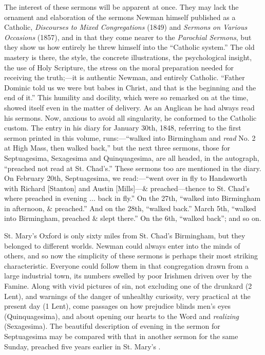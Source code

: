 The interest of these sermons will be apparent at
once. They may lack the ornament and elaboration of the sermons Newman
himself published as a Catholic, \emph{Discourses to Mixed Congregations}
(1849) and \emph{Sermons} \emph{on Various Occasions} (1857), and
in that they come nearer to the \emph{Parochial Sermons}, but they
show us how entirely he threw himself into the ``Catholic system.'' The
old mastery is there, the style, the concrete illustrations, the
psychological insight, the use of Holy Scripture, the stress on the
moral preparation needed for receiving the truth;—it is authentic
Newman, and entirely Catholic. ``Father Dominic told us we were but
babes in Christ, and that is the beginning and the end of it.'' This
humility and docility, which were so remarked on at the time, showed
itself even in the matter of delivery. As an Anglican he had always
read his sermons. Now, anxious to avoid all singularity, he conformed
to the Catholic custom. The entry in his diary for January 30th, 1848,
referring to the first sermon printed in this volume, runs:—``walked
into Birmingham and \emph{read} No. 2 at High Mass, then walked back,''
but the next three sermons, those for Septuagesima, Sexagesima and
Quinquagesima, are all headed, in the autograph, ``preached not read at
St. Chad's.'' These sermons too are mentioned in the diary. On February
20th, Septuagesima, we read:—``went over in fly to Handsworth with
Richard [Stanton] and Austin [Mills]—\& preached—thence to St.
Chad's where preached in evening ... back in fly.'' On the 27th, ``walked
into Birmingham in afternoon, \& preached.'' And on the 28th, ``walked
back.'' March 5th, ``walked into Birmingham, preached \& slept
there.'' On the 6th, ``walked back''; and so on.


St. Mary's Oxford is only sixty miles from St.
Chad's Birmingham, but they belonged to different worlds. Newman could
always enter into the minds of others, and so now the simplicity of
these sermons is perhaps their most striking characteristic. Everyone
could follow them in that congregation drawn from a large industrial
town, its numbers swelled by poor Irishmen driven over by the Famine.
Along with vivid pictures of sin, not excluding one of the drunkard (2
Lent), and warnings of the danger of unhealthy curiosity, very
practical at the present day (1 Lent), come passages on how prejudice
blinds men's eyes (Quinquagesima), and about opening our hearts to the
Word and \emph{realizing} (Sexagesima). The beautiful description of
evening in the sermon for Septuagesima may be compared with that in
another sermon for the same Sunday, preached five years earlier in St.
Mary's .


